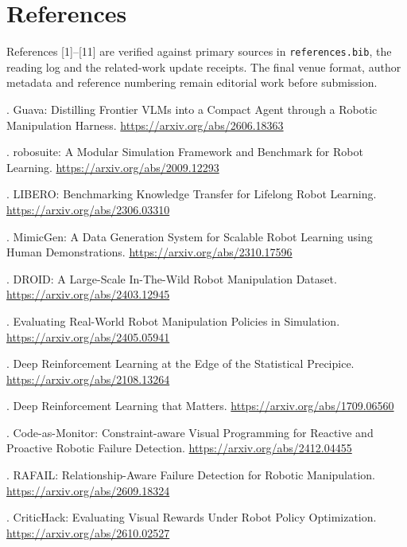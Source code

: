\documentclass[10pt]{article}
\begin{document}
\section*{References}

References [1]--[11] are verified against primary sources in \texttt{references.bib}, the reading log and the related-work update receipts. The final venue format, author metadata and reference numbering remain editorial work before submission.

\par{}. Guava: Distilling Frontier VLMs into a Compact Agent through a Robotic Manipulation Harness. \url{https://arxiv.org/abs/2606.18363}\par
\par{}. robosuite: A Modular Simulation Framework and Benchmark for Robot Learning. \url{https://arxiv.org/abs/2009.12293}\par
\par{}. LIBERO: Benchmarking Knowledge Transfer for Lifelong Robot Learning. \url{https://arxiv.org/abs/2306.03310}\par
\par{}. MimicGen: A Data Generation System for Scalable Robot Learning using Human Demonstrations. \url{https://arxiv.org/abs/2310.17596}\par
\par{}. DROID: A Large-Scale In-The-Wild Robot Manipulation Dataset. \url{https://arxiv.org/abs/2403.12945}\par
\par{}. Evaluating Real-World Robot Manipulation Policies in Simulation. \url{https://arxiv.org/abs/2405.05941}\par
\par{}. Deep Reinforcement Learning at the Edge of the Statistical Precipice. \url{https://arxiv.org/abs/2108.13264}\par
\par{}. Deep Reinforcement Learning that Matters. \url{https://arxiv.org/abs/1709.06560}\par
\par{}. Code-as-Monitor: Constraint-aware Visual Programming for Reactive and Proactive Robotic Failure Detection. \url{https://arxiv.org/abs/2412.04455}\par
\par{}. RAFAIL: Relationship-Aware Failure Detection for Robotic Manipulation. \url{https://arxiv.org/abs/2609.18324}\par
\par{}. CriticHack: Evaluating Visual Rewards Under Robot Policy Optimization. \url{https://arxiv.org/abs/2610.02527}\par
\end{document}
